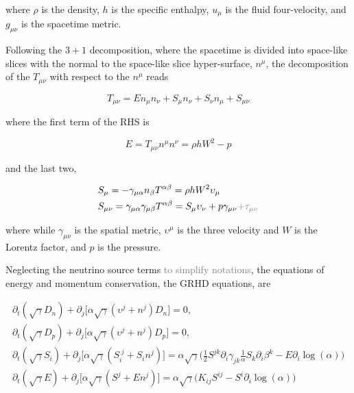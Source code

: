 \documentclass[11pt,a4paper,headinclude=true,DIV=14,BCOR=8mm,chapterprefix,listof=totoc,twoside,openright,abstracton]{scrbook}
\newcommand{\gray}[1]{\textcolor{gray}{#1}}
\begin{document}
where $\rho$ is the density, $h$ is the specific enthalpy, $u_{\mu}$ is the fluid four-velocity, and 
$g_{\mu\nu}$ is the spacetime metric.

Following the $3+1$ decomposition, 
where the spacetime is divided into space-like slices with 
the normal to the space-like slice hyper-surface, $n^{\mu}$,
the decomposition of the $T_{\mu\nu}$ with respect to the $n^{\mu}$ reads

\begin{equation}
    T_{\mu\nu} = En_{\mu}n_{\nu} + S_{\mu}n_{\nu} + S_{\nu}n_{\mu} + S_{\mu\nu}
\end{equation}

where the first term of the RHS is

\begin{equation}
    E = T_{\mu\nu}n^{\mu}n^{\nu} = \rho h W^2 - p
\end{equation}

and the last two,

\begin{eqnarray}
    & S_{\mu} = -\gamma_{\mu\alpha}n_{\beta}T^{\alpha\beta} = \rho h W^2 \upsilon_{\mu} \\
    & S_{\mu\nu} = \gamma_{\mu\alpha}\gamma_{\mu\beta}T^{\alpha\beta} = S_{\mu}\upsilon_{\nu} + p \gamma_{\mu\nu} \gray{ + \tau_{\mu\nu}}
\end{eqnarray}

where while $\gamma_{\mu\nu}$ is the spatial metric, $\upsilon^{\mu}$ is the three velocity and $W$ is the Lorentz factor, and $p$ is the pressure. 

Neglecting the neutrino source terms \gray{to simplify notations}, the equations of energy and momentum conservation, the GRHD equations, are 

\begin{eqnarray}
\label{eq:method:whisky:emomcons_lk}
    \partial_t(\sqrt{\gamma}D_n) + \partial_j\Big[ \alpha\sqrt{\gamma}(\upsilon^j + n^j)D_n \Big] = 0, \\
    \partial_t(\sqrt{\gamma}D_p) + \partial_j\Big[ \alpha\sqrt{\gamma}(\upsilon^j + n^j)D_p \Big] = 0, \\
    \partial_t(\sqrt{\gamma}S_i) + \partial_j\Big[ \alpha \sqrt{\gamma} (S_i^{\; j} + S_i n^j) \Big] = 
    \alpha \sqrt{\gamma}\Big( \frac{1}{2} S^{jk} \partial_i \gamma_{jk} \frac{1}{\alpha} S_k \partial_i \beta^k - E\partial_i \log(\alpha) \Big) \\
    \partial_t(\sqrt{\gamma}E) + \partial_j\Big[ \alpha \sqrt{\gamma} (S^{j} + E n^j) \Big] = 
    \alpha \sqrt{\gamma}\Big( K_{ij}S^{ij} - S^i\partial_i \log(\alpha) \Big) 
\end{eqnarray}
\end{document}
